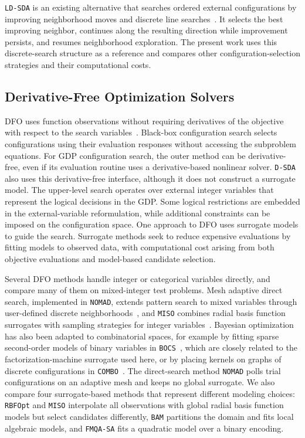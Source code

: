 \documentclass{article}
\begin{document}
\texttt{LD-SDA} is an existing alternative that searches ordered external configurations by improving neighborhood moves and discrete line searches~\citep{ovalle2025logic}.
It selects the best improving neighbor, continues along the resulting direction while improvement persists, and resumes neighborhood exploration.
The present work uses this discrete-search structure as a reference and compares other configuration-selection strategies and their computational costs.

\subsection{Derivative-Free Optimization Solvers}

DFO uses function observations without requiring derivatives of the objective with respect to the search variables~\citep{larson2019derivative}.
Black-box configuration search selects configurations using their evaluation responses without accessing the subproblem equations.
For GDP configuration search, the outer method can be derivative-free, even if its evaluation routine uses a derivative-based nonlinear solver.
\texttt{D-SDA} also uses this derivative-free interface, although it does not construct a surrogate model.
The upper-level search operates over external integer variables that represent the logical decisions in the GDP. 
Some logical restrictions are embedded in the external-variable reformulation, while additional constraints can be imposed on the configuration space.
One approach to DFO uses surrogate models to guide the search.
Surrogate methods seek to reduce expensive evaluations by fitting models to observed data, with computational cost arising from both objective evaluations and model-based candidate selection.

Several DFO methods handle integer or categorical variables directly, and \citet{ploskas2022review} compare many of them on mixed-integer test problems.
Mesh adaptive direct search, implemented in \texttt{NOMAD}, extends pattern search to mixed variables through user-defined discrete neighborhoods~\citep{abramson2009mads,audet2022nomad}, and \texttt{MISO} combines radial basis function surrogates with sampling strategies for integer variables~\citep{muller2016miso}.
Bayesian optimization has also been adapted to combinatorial spaces, for example by fitting sparse second-order models of binary variables in \texttt{BOCS}~\citep{baptista2018bocs}, which are closely related to the factorization-machine surrogate used here, or by placing kernels on graphs of discrete configurations in \texttt{COMBO}~\citep{oh2019combo}.
The direct-search method \texttt{NOMAD} polls trial configurations on an adaptive mesh and keeps no global surrogate.
We also compare four surrogate-based methods that represent different modeling choices: \texttt{RBFOpt} and \texttt{MISO} interpolate all observations with global radial basis function models but select candidates differently, \texttt{BAM} partitions the domain and fits local algebraic models, and \texttt{FMQA-SA} fits a quadratic model over a binary encoding.
\end{document}
